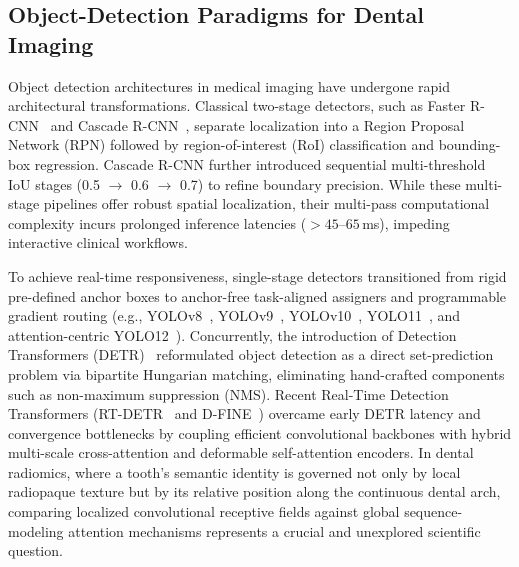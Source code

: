 \documentclass[10pt,journal,compsoc]{IEEEtran}
\begin{document}
\subsection{Object-Detection Paradigms for Dental Imaging}
Object detection architectures in medical imaging have undergone rapid architectural transformations. Classical two-stage detectors, such as Faster R-CNN~\cite{ren2015faster} and Cascade R-CNN~\cite{cai2018cascade}, separate localization into a Region Proposal Network (RPN) followed by region-of-interest (RoI) classification and bounding-box regression. Cascade R-CNN further introduced sequential multi-threshold IoU stages (0.5 $\rightarrow$ 0.6 $\rightarrow$ 0.7) to refine boundary precision. While these multi-stage pipelines offer robust spatial localization, their multi-pass computational complexity incurs prolonged inference latencies ($>45\text{--}65$\,ms), impeding interactive clinical workflows.

To achieve real-time responsiveness, single-stage detectors transitioned from rigid pre-defined anchor boxes to anchor-free task-aligned assigners and programmable gradient routing (e.g., YOLOv8~\cite{yolov8}, YOLOv9~\cite{wang2024yolov9}, YOLOv10~\cite{wang2024yolov10}, YOLO11~\cite{ultralytics2024}, and attention-centric YOLO12~\cite{tian2025yolo12}). Concurrently, the introduction of Detection Transformers (DETR)~\cite{carion2020detr} reformulated object detection as a direct set-prediction problem via bipartite Hungarian matching, eliminating hand-crafted components such as non-maximum suppression (NMS). Recent Real-Time Detection Transformers (RT-DETR~\cite{lv2023detr} and D-FINE~\cite{peng2024dfine}) overcame early DETR latency and convergence bottlenecks by coupling efficient convolutional backbones with hybrid multi-scale cross-attention and deformable self-attention encoders. In dental radiomics, where a tooth's semantic identity is governed not only by local radiopaque texture but by its relative position along the continuous dental arch, comparing localized convolutional receptive fields against global sequence-modeling attention mechanisms represents a crucial and unexplored scientific question.
\end{document}
